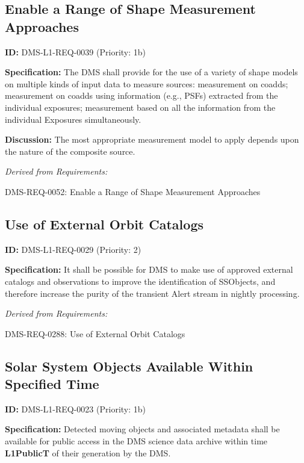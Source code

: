 \documentclass[SE,toc,lsstdraft]{lsstdoc}
\begin{document}
\subsection{Enable a Range of Shape Measurement Approaches}

\label{DMS-L1-REQ-0039}
\textbf{ID:} DMS-L1-REQ-0039 (Priority: 1b)

\textbf{Specification:} The DMS shall provide for the use of a variety of shape models on multiple kinds of input data to measure sources: measurement on coadds; measurement on coadds using information (e.g., PSFs) extracted from the individual exposures; measurement based on all the information from the individual Exposures simultaneously.

\textbf{Discussion: }The most appropriate measurement model to apply depends upon the nature of the composite source.

\emph{Derived from Requirements:}

DMS-REQ-0052:
Enable a Range of Shape Measurement Approaches \newline

\subsection{Use of External Orbit Catalogs}

\label{DMS-L1-REQ-0029}
\textbf{ID:} DMS-L1-REQ-0029 (Priority: 2)

\textbf{Specification:} It shall be possible for DMS to make use of approved external catalogs and observations to improve the identification of SSObjects, and therefore increase the purity of the transient Alert stream in nightly processing.

\emph{Derived from Requirements:}

DMS-REQ-0288:
Use of External Orbit Catalogs \newline

\subsection{Solar System Objects Available Within Specified Time}

\label{DMS-L1-REQ-0023}
\textbf{ID:} DMS-L1-REQ-0023 (Priority: 1b)

\textbf{Specification:} Detected moving objects and associated metadata shall be available for public access in the DMS science data archive within time \textbf{L1PublicT }of their generation by the DMS.
\end{document}
